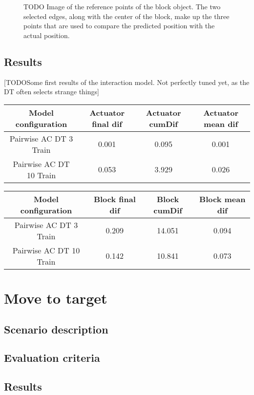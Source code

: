 \begin{figure}

\caption{TODO Image of the reference points of the block object. The two selected edges, along with the center of the block, make up the three points that are used
to compare the predicted position with the actual position.}
\label{fig:refPoints}
\end{figure}

\subsection{Results}
[TODOSome first results of the interaction model. Not perfectly tuned yet, as the DT often selects strange things]

\begin{tabular}{|c|c|c|c|}
\hline Model configuration & Actuator final dif & Actuator cumDif & Actuator mean dif \\ 
\hline Pairwise AC DT 3 Train & 0.001 & 0.095 & 0.001  \\ 
\hline Pairwise AC DT 10 Train & 0.053 & 3.929 & 0.026  \\ 
\hline 
\end{tabular} 

\begin{tabular}{|c|c|c|c|}
\hline Model configuration & Block final dif & Block cumDif & Block mean dif \\ 
\hline Pairwise AC DT 3 Train & 0.209 & 14.051 & 0.094  \\ 
\hline Pairwise AC DT 10 Train & 0.142 & 10.841 & 0.073  \\ 
\hline 
\end{tabular} 



\section{Move to target}

\subsection{Scenario description}

\subsection{Evaluation criteria}

\subsection{Results}